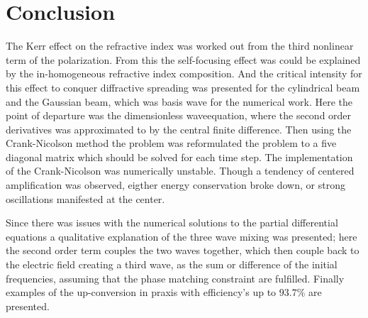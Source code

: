 \chapter{Conclusion}
\label{cha:conclusion}


The Kerr effect on the refractive index was worked out from the third nonlinear term of the polarization.
From this the self-focusing effect was could be explained by the in-homogeneous refractive index composition.
And the critical intensity for this effect to conquer diffractive spreading was presented for the cylindrical beam and the Gaussian beam, which was basis wave for the numerical work. 
Here the point of departure was the dimensionless waveequation, where the second order derivatives was approximated to by the central finite difference. Then using the Crank-Nicolson method the problem was reformulated the problem to a five diagonal matrix which should be solved for each time step. The implementation of the Crank-Nicolson was numerically unstable. Though a tendency of centered amplification was observed, eigther energy conservation broke down, or strong oscillations manifested at the center.


Since there was issues with the numerical solutions to the partial differential equations a qualitative explanation of the three wave mixing was presented; here the second order term couples the two waves together, which then couple back to the electric field creating a third wave, as the sum or difference of the initial frequencies, assuming that the phase matching constraint are fulfilled. Finally examples of the up-conversion in praxis with efficiency's up to $93.7\%$ are presented.


